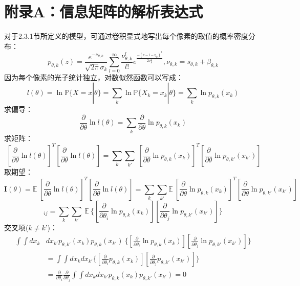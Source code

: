 \documentclass[draft=false,oneside]{fduthesis}
\begin{document}
    \appendix
    \chapter*{附录A：信息矩阵的解析表达式}

    \par 对于2.3.1节所定义的模型，可通过卷积显式地写出每个像素的取值的概率密度分布：
    \begin{equation}
        p_{\theta, k}(z)=\frac{e^{-\nu_{\theta, k}}}{\sqrt{2 \pi} \sigma_{k}} \sum_{l=0}^{\infty} \frac{\nu_{\theta, k}^{l}}{l!} e^{\frac{-\left(z-l-\eta_{k}\right)^{2}}{2 \sigma_{k}^{2}}},\nu_{\theta, k}=s_{\theta,k}+\beta_{\theta,k}
        \label{distribution}
    \end{equation}
    因为每个像素的光子统计独立，对数似然函数可以写成：
    \begin{equation}
        l(\theta)=\ln \mathbb{P}\{X=x|\theta\}=\sum_k \ln \mathbb{P}\{X_k=x_k|\theta\}=\sum_k \ln p_{\theta, k}(x_k)
    \end{equation}
    求偏导：
    \begin{equation}
        \frac{\partial}{\partial\theta}\ln l(\theta)=\sum_k \frac{\partial}{\partial\theta} \ln p_{\theta, k}(x_k)
    \end{equation}
    求矩阵：
    \begin{equation}
        \ [\frac{\partial}{\partial\theta}\ln l(\theta)]^T[\frac{\partial}{\partial\theta}\ln l(\theta)]=\sum_k \sum_{k'}\ [\frac{\partial}{\partial\theta}\ln p_{\theta, k}(x_k)]^T[\frac{\partial}{\partial\theta}\ln p_{\theta, {k'}}(x_{k'})]
    \end{equation}
    取期望：
    \begin{equation}
        \textbf{I}(\theta)=\mathbb{E}\ [\frac{\partial}{\partial\theta}\ln l(\theta)]^T[\frac{\partial}{\partial\theta}\ln l(\theta)]=\sum_k \sum_{k'}\mathbb{E}\ [\frac{\partial}{\partial\theta}\ln p_{\theta, k}(x_k)]^T[\frac{\partial}{\partial\theta}\ln p_{\theta, {k'}}(x_{k'})]
    \end{equation}
    \begin{equation}
        [\textbf{I}(\theta)]_{ij}=\sum_k \sum_{k'}\ \mathbb{E}\ \{[\frac{\partial}{\partial\theta_i}\ln p_{\theta, k}(x_k)][\frac{\partial}{\partial\theta_j}\ln p_{\theta, {k'}}(x_{k'})]\} 
    \end{equation}
    交叉项($k\ne k’$)：
    \begin{equation}
        \begin{aligned}
            \int \int dx_k &dx_{k'} p_{\theta,k'}(x_k)p_{\theta,k}(x_{k'})\ \{[\frac{\partial}{\partial\theta_i}\ln p_{\theta, k}(x_k)][\frac{\partial}{\partial\theta_j}\ln p_{\theta, {k'}}(x_{k'})]\} \\  & =\int \int dx_k dx_{k'} \{[\frac{\partial}{\partial\theta_i} p_{\theta, k}(x_k)][\frac{\partial}{\partial\theta_j} p_{\theta, {k'}}(x_{k'})]\} \\ & =\frac{\partial}{\partial\theta_i}\frac{\partial}{\partial\theta_j}\int \int dx_k dx_{k'} p_{\theta, k}(x_k)p_{\theta, {k'}}(x_{k'})=0
        \end{aligned}
    \end{equation}
\end{document}
